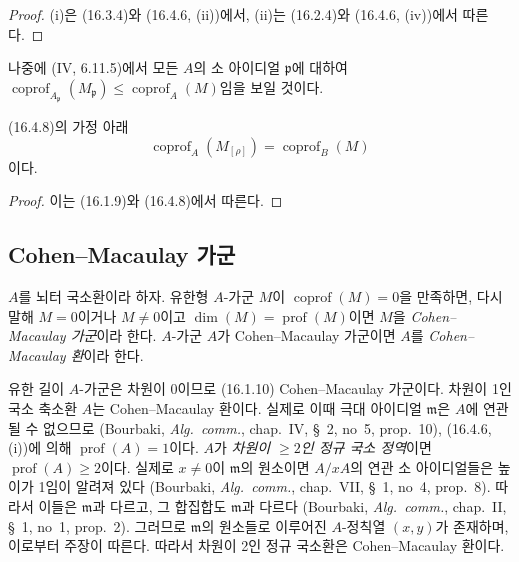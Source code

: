 \begin{proof}
(i)은 (16.3.4)와 (16.4.6, (ii))에서, (ii)는 (16.2.4)와
(16.4.6, (iv))에서 따른다.
\end{proof}

나중에 (IV, 6.11.5)에서 모든 $A$의 소 아이디얼 $\mathfrak{p}$에 대하여
$\operatorname{coprof}_{A_{\mathfrak{p}}}(M_{\mathfrak{p}})
\leq\operatorname{coprof}_A(M)$임을 보일 것이다.

\begin{proposition}[16.4.11]
\label{0.16.4.11-fr}
(16.4.8)의 가정 아래
\begin{equation}
\label{0.16.4.11.1-fr}
\tag{16.4.11.1}
  \operatorname{coprof}_A(M_{[\rho]})=\operatorname{coprof}_B(M)
\end{equation}
이다.
\end{proposition}

\begin{proof}
이는 (16.1.9)와 (16.4.8)에서 따른다.
\end{proof}

\subsection{Cohen--Macaulay 가군}
\label{subsection:0.16.5-fr}

\begin{definition}[16.5.1]
\label{0.16.5.1-fr}
$A$를 뇌터 국소환이라 하자. 유한형 $A$-가군 $M$이
$\operatorname{coprof}(M)=0$을 만족하면, 다시 말해 $M=0$이거나
$M\neq0$이고 $\dim(M)=\operatorname{prof}(M)$이면 $M$을
\emph{Cohen--Macaulay 가군}이라 한다. $A$-가군 $A$가
Cohen--Macaulay 가군이면 $A$를 \emph{Cohen--Macaulay 환}이라 한다.
\end{definition}

유한 길이 $A$-가군은 차원이 0이므로 (16.1.10) Cohen--Macaulay
가군이다. 차원이 1인 국소 축소환 $A$는 Cohen--Macaulay 환이다.
실제로 이때 극대 아이디얼 $\mathfrak{m}$은 $A$에 연관될 수 없으므로
(Bourbaki, \emph{Alg.~comm.}, chap.~IV, \S~2, no~5, prop.~10),
(16.4.6, (i))에 의해 $\operatorname{prof}(A)=1$이다.
$A$가 \emph{차원이 $\geq2$인 정규 국소 정역}이면
$\operatorname{prof}(A)\geq2$이다. 실제로
$x\neq0$이 $\mathfrak{m}$의 원소이면 $A/xA$의 연관 소 아이디얼들은
높이가 1임이 알려져 있다
(Bourbaki, \emph{Alg.~comm.}, chap.~VII, \S~1, no~4, prop.~8).
따라서 이들은 $\mathfrak{m}$과 다르고, 그 합집합도
$\mathfrak{m}$과 다르다
(Bourbaki, \emph{Alg.~comm.}, chap.~II, \S~1, no~1, prop.~2).
그러므로 $\mathfrak{m}$의 원소들로 이루어진 $A$-정칙열 $(x,y)$가
존재하며, 이로부터 주장이 따른다. 따라서 차원이 2인 정규 국소환은
Cohen--Macaulay 환이다.

